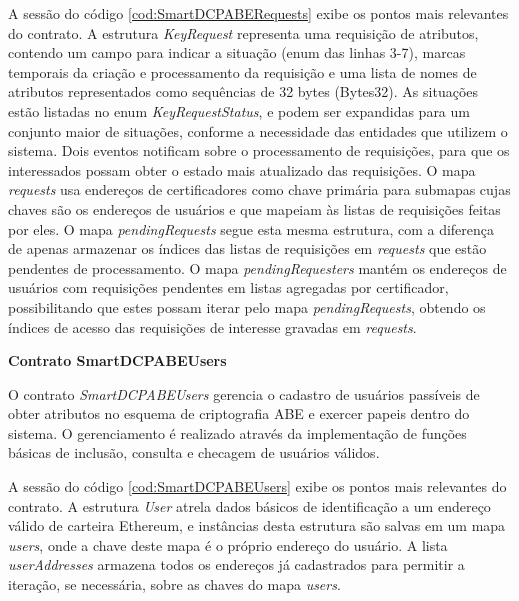 \documentclass[a4paper,11pt]{article}
\begin{document}

A sessão do código \ref{cod:SmartDCPABERequests} exibe os pontos mais relevantes do contrato.
A estrutura \emph{KeyRequest} representa uma requisição de atributos, contendo um campo para indicar a situação (enum das linhas 3-7), marcas temporais da criação e processamento da requisição e uma lista de nomes de atributos representados como sequências de 32 bytes (Bytes32).
As situações estão listadas no enum \emph{KeyRequestStatus}, e podem ser expandidas para um conjunto maior de situações, conforme a necessidade das entidades que utilizem o sistema.
Dois eventos notificam sobre o processamento de requisições, para que os interessados possam obter  o estado mais atualizado das requisições.
O mapa \emph{requests} usa endereços de certificadores como chave primária para submapas cujas chaves são os endereços de usuários e que mapeiam às listas de requisições feitas por eles.
O mapa \emph{pendingRequests} segue esta mesma estrutura, com a diferença de apenas armazenar os índices das listas de requisições em \emph{requests} que estão pendentes de processamento.
O mapa \emph{pendingRequesters} mantém os endereços de usuários com requisições pendentes em listas agregadas por certificador, possibilitando que estes possam iterar pelo mapa \emph{pendingRequests}, obtendo os índices de acesso das requisições de interesse gravadas em \emph{requests}.

\textbf{Contrato SmartDCPABEUsers}



O contrato \emph{SmartDCPABEUsers} gerencia o cadastro de usuários passíveis de obter atributos no esquema de criptografia ABE e exercer papeis dentro do sistema.
O gerenciamento é realizado através da implementação de funções básicas de inclusão, consulta e checagem de usuários válidos.

A sessão do código \ref{cod:SmartDCPABEUsers} exibe os pontos mais relevantes do contrato. A estrutura \emph{User} atrela dados básicos de identificação a um endereço válido de carteira Ethereum, e instâncias desta estrutura são salvas em um mapa \emph{users}, onde a chave deste mapa é o próprio endereço do usuário.
A lista \emph{userAddresses} armazena todos os endereços já cadastrados para permitir a iteração, se necessária, sobre as chaves do mapa \emph{users}.
\end{document}
